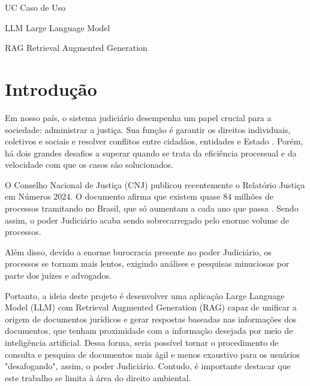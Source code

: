 \documentclass[
	12pt,				%
	openright,			%
	oneside,			    %
	a4paper,				%
	english,			%
	french,			%
	spanish,			%
	brazil			%
	]{abntex2}
\begin{document}
\begin{siglas}
  \item[UC] Caso de Uso
  \item [LLM] Large Language Model
  \item [RAG] Retrieval Augmented Generation
\end{siglas}

\tableofcontents*
\cleardoublepage



\textual


\chapter{Introdução}
Em nosso país, o sistema judiciário desempenha um papel crucial para a sociedade: administrar a justiça. Sua função é garantir os direitos individuais, coletivos e sociais e resolver conflitos entre cidadãos, entidades e Estado \cite{TJSP2024}. Porém, há dois grandes desafios a superar quando se trata da eficiência processual e da velocidade com que os casos são solucionados.

O Conselho Nacional de Justiça (CNJ) publicou recentemente o Relatório Justiça em Números 2024. O documento afirma que existem quase  84 milhões de processos tramitando no Brasil, que só aumentam a cada ano que passa \cite{CNJ2024}. Sendo assim, o poder Judiciário acaba sendo sobrecarregado pelo enorme volume de processos.

Além disso, devido a enorme burocracia presente no poder Judiciário, os processos se tornam mais lentos, exigindo análises e pesquisas minuciosas por parte dos juízes e advogados.

Portanto, a ideia deste projeto é desenvolver uma aplicação  Large Language Model (LLM) com Retrieval Augmented Generation (RAG) capaz de unificar a origem de documentos jurídicos e gerar respostas baseadas nas informações dos documentos, que tenham proximidade com a informação desejada por meio de inteligência artificial. Dessa forma, seria possível tornar o procedimento de consulta e pesquisa de documentos mais ágil e menos exaustivo para os usuários "desafogando", assim, o poder Judiciário. Contudo, é importante destacar que este trabalho se limita à área do direito ambiental.
\end{document}
